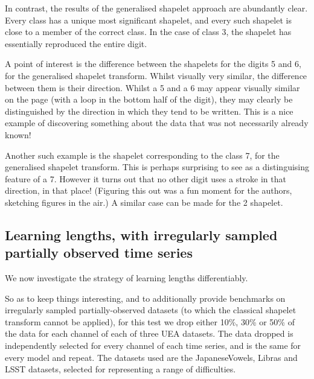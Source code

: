 \documentclass{article}
\theoremstyle{plain}
\theoremstyle{definition}
\begin{document}
In contrast, the results of the generalised shapelet approach are abundantly clear. Every class has a unique most significant shapelet, and every such shapelet is close to a member of the correct class. In the case of class 3, the shapelet has essentially reproduced the entire digit.


A point of interest is the difference between the shapelets for the digits 5 and 6, for the generalised shapelet transform. Whilst visually very similar, the difference between them is their direction. Whilst a 5 and a 6 may appear visually similar on the page (with a loop in the bottom half of the digit), they may clearly be distinguished by the direction in which they tend to be written. This is a nice example of discovering something about the data that was not necessarily already known!

Another such example is the shapelet corresponding to the class 7, for the generalised shapelet transform. This is perhaps surprising to see as a distinguising feature of a 7. However it turns out that no other digit uses a stroke in that direction, in that place! (Figuring this out was a fun moment for the authors, sketching figures in the air.) A similar case can be made for the 2 shapelet.

\subsection{Learning lengths, with irregularly sampled partially observed time series} \label{subsec:uea_missing_and_length}
We now investigate the strategy of learning lengths differentiably.

So as to keep things interesting, and to additionally provide benchmarks on irregularly sampled partially-observed datasets (to which the classical shapelet transform cannot be applied), for this test we drop either 10\%, 30\% or 50\% of the data for each channel of each of three UEA datasets. The data dropped is independently selected for every channel of each time series, and is the same for every model and repeat. The datasets used are the JapaneseVowels, Libras and LSST datasets, selected for representing a range of difficulties.
\end{document}
